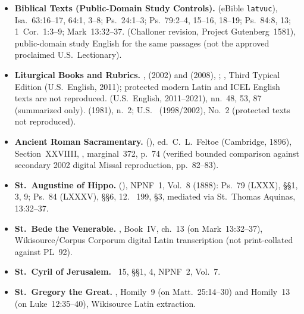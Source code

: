 \begin{itemize}[leftmargin=1.5em,itemsep=0.25em]

\item \textbf{Biblical Texts (Public-Domain Study Controls).}  (eBible \texttt{latvuc}), Isa.~63:16--17, 64:1, 3--8; Ps.~24:1--3; Ps.~79:2--4, 15--16, 18--19; Ps.~84:8, 13; 1~Cor.~1:3--9; Mark~13:32--37.  (Challoner revision, Project Gutenberg~1581), public-domain study English for the same passages (not the approved proclaimed U.S.\ Lectionary).

\item \textbf{Liturgical Books and Rubrics.} ,  (2002) and  (2008), ; , Third Typical Edition (U.S.\ English, 2011); protected modern Latin and ICEL English texts are not reproduced.  (U.S.\ English, 2011--2021), nn.~48, 53, 87 (summarized only).  (1981), n.~2; U.S.\  (1998/2002), No.~2 (protected texts not reproduced).

\item \textbf{Ancient Roman Sacramentary.}  (), ed.\ C.~L.\ Feltoe (Cambridge, 1896), Section~XXVIIII, , marginal~372, p.~74 (verified bounded comparison against secondary 2002 digital Missal reproduction, pp.~82--83).

\item \textbf{St.~Augustine of Hippo.}  (), NPNF~1, Vol.~8 (1888): Ps.~79 (LXXX), §§1, 3, 9; Ps.~84 (LXXXV), §§6, 12. ~199, §3, mediated via St.~Thomas Aquinas,  13:32--37.

\item \textbf{St.~Bede the Venerable.} , Book~IV, ch.~13 (on Mark~13:32--37), Wikisource/Corpus Corporum digital Latin transcription (not print-collated against PL~92).

\item \textbf{St.~Cyril of Jerusalem.} ~15, §§1, 4, NPNF~2, Vol.~7.

\item \textbf{St.~Gregory the Great.} , Homily~9 (on Matt.~25:14--30) and Homily~13 (on Luke~12:35--40), Wikisource Latin extraction.


\end{itemize}
